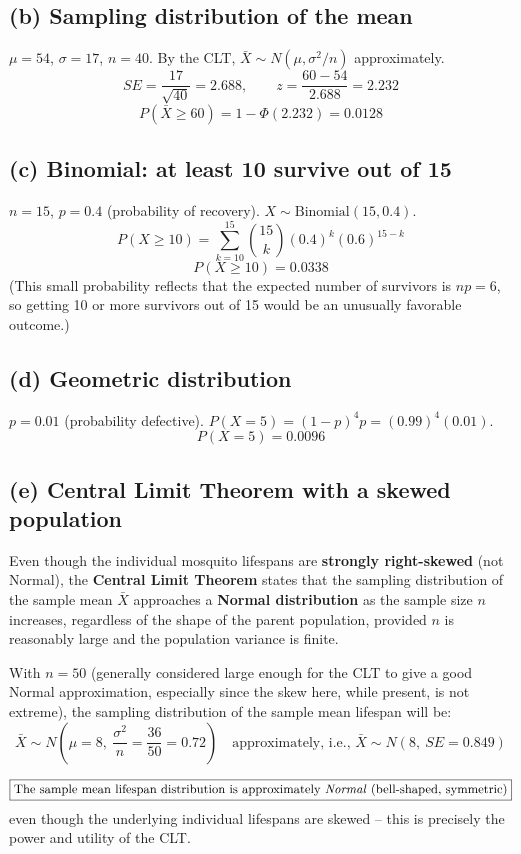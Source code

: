 \documentclass[11pt]{article}
\begin{document}
\subsection*{(b) Sampling distribution of the mean}
$\mu=54$, $\sigma=17$, $n=40$. By the CLT, $\bar{X}\sim N(\mu,\sigma^2/n)$ approximately.
\[
SE = \frac{17}{\sqrt{40}} = 2.688, \qquad z = \frac{60-54}{2.688} = 2.232
\]
\[
\boxed{P(\bar{X}\ge 60) = 1-\Phi(2.232) = 0.0128}
\]

\subsection*{(c) Binomial: at least 10 survive out of 15}
$n=15$, $p=0.4$ (probability of recovery). $X\sim\text{Binomial}(15,0.4)$.
\[
P(X\ge 10) = \sum_{k=10}^{15}\binom{15}{k}(0.4)^k(0.6)^{15-k}
\]
\[
\boxed{P(X\ge 10) = 0.0338}
\]
(This small probability reflects that the expected number of survivors is $np=6$, so getting 10 or more survivors out of 15 would be an unusually favorable outcome.)

\subsection*{(d) Geometric distribution}
$p=0.01$ (probability defective). $P(X=5) = (1-p)^4p = (0.99)^4(0.01)$.
\[
\boxed{P(X=5) = 0.0096}
\]

\subsection*{(e) Central Limit Theorem with a skewed population}
Even though the individual mosquito lifespans are \textbf{strongly right-skewed} (not Normal), the \textbf{Central Limit Theorem} states that the sampling distribution of the sample mean $\bar{X}$ approaches a \textbf{Normal distribution} as the sample size $n$ increases, regardless of the shape of the parent population, provided $n$ is reasonably large and the population variance is finite.

With $n=50$ (generally considered large enough for the CLT to give a good Normal approximation, especially since the skew here, while present, is not extreme), the sampling distribution of the sample mean lifespan will be:
\[
\bar{X} \sim N\left(\mu=8,\ \frac{\sigma^2}{n}=\frac{36}{50}=0.72\right) \quad \text{approximately, i.e., } \bar{X}\sim N(8,\ SE=0.849)
\]

\[
\boxed{\text{The sample mean lifespan distribution is approximately \emph{Normal} (bell-shaped, symmetric)}}
\]
even though the underlying individual lifespans are skewed -- this is precisely the power and utility of the CLT.
\end{document}

